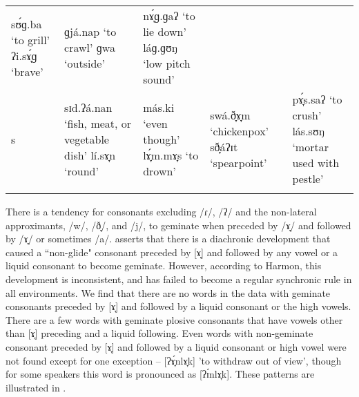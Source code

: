 \begin{table}[p]
\begin{tabularx}{\textwidth}{lQQQQ}
sʊ́ɡ.ba \newline ‘to grill’
\newline
ʔi.sɤ̞́ɡ \newline ‘brave’ &
ɡjá.nap \newline ‘to crawl’
\newline
ɡwa \newline ‘outside’ &
nɤ̞́ɡ.ɡaʔ \newline ‘to lie down’
\newline
láɡ.ɡʊŋ \newline ‘low pitch sound’ \\
\tablevspace
s & sɪd.ʔá.nan \newline ‘fish, meat, or vegetable dish’
\newline
lí.sɤ̞n \newline ‘round’ &
más.ki \newline ‘even though’
\newline
lɤ̞́m.mɤ̞s \newline ‘to drown’ &
swá.ð̞ɤ̞m \newline ‘chickenpox’
\newline
sð̞áʔɪt \newline ‘spearpoint’ &
pɤ̞́s.saʔ \newline ‘to crush’
\newline
lás.sʊŋ \newline ‘mortar used with pestle’ \\
\lspbottomrule
\end{tabularx}
\end{table}

\newpage
There is a tendency for consonants excluding /ɾ/, /ʔ/ and the non-lateral approximants, /w/, /ð̞/, and /j/, to geminate when preceded by /ɤ̞/ and followed by /ɤ̞/ or sometimes /a/. \citet[30]{harmon1977} asserts that there is a diachronic development that caused a ``non-glide" consonant preceded by [ɤ̞] and followed by any vowel or a liquid consonant to become geminate. However, according to Harmon, this development is inconsistent, and has failed to become a regular synchronic rule in all environments. We find that there are no words in the data with geminate consonants preceded by [ɤ̞] and followed by a liquid consonant or the high vowels. There are a few words with geminate plosive consonants that have vowels other than [ɤ̞] preceding and a liquid following. Even words with non-geminate consonant preceded by [ɤ̞] and followed by a liquid consonant or high vowel were not found except for one exception -- [ʔɤ̞́nlɤ̞k] ’to withdraw out of view’, though for some speakers this word is pronounced as [ʔɪ́nlɤ̞k]. These patterns are illustrated in .

